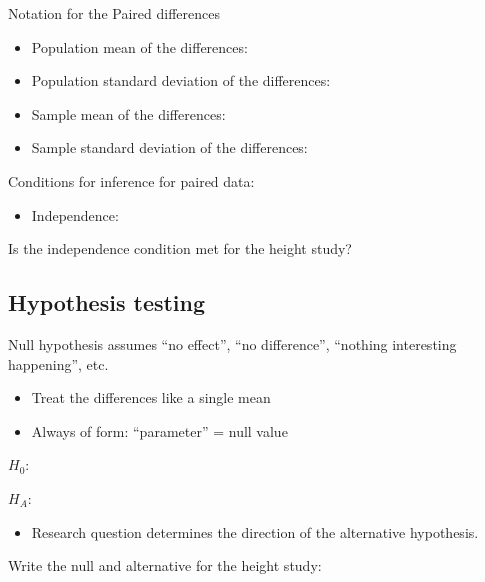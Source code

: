 \documentclass[
]{report}
\providecommand{\tightlist}{%
  \setlength{\itemsep}{0pt}\setlength{\parskip}{0pt}}
\begin{document}

Notation for the Paired differences

\begin{itemize}
\item
  Population mean of the differences:
\item
  Population standard deviation of the differences:
\item
  Sample mean of the differences:
\item
  Sample standard deviation of the differences:
\end{itemize}

Conditions for inference for paired data:

\begin{itemize}
\tightlist
\item
  Independence:
\end{itemize}

\vspace{0.5in}

Is the independence condition met for the height study?

\vspace{0.5in}

\subsection*{Hypothesis testing}\label{hypothesis-testing-5}

Null hypothesis assumes ``no effect'', ``no difference'', ``nothing interesting happening'', etc.

\begin{itemize}
\item
  Treat the differences like a single mean
\item
  Always of form: ``parameter'' = null value
\end{itemize}

\(H_0:\)

\vspace{0.2in}

\(H_A:\)

\vspace{0.2in}

\begin{itemize}
\tightlist
\item
  Research question determines the direction of the alternative hypothesis.
\end{itemize}

Write the null and alternative for the height study:
\end{document}
